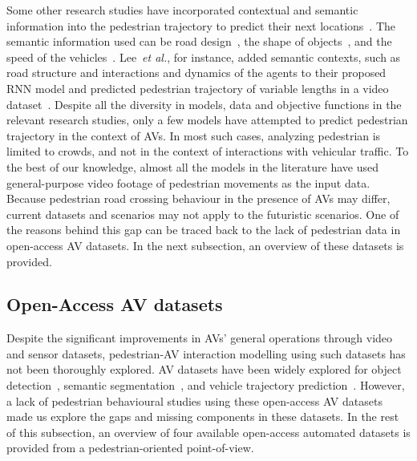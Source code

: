 Some other research studies have incorporated contextual and semantic information into the pedestrian trajectory to predict their next locations~\cite{lee2017desire,chandra2019traphic,rasouli2019pie}. The semantic information used can be road design~\cite{bi2019joint}, the shape of objects~\cite{chandra2019traphic}, and the speed of the vehicles~\cite{bhattacharyya2018long,rasouli2019pie}. Lee~\textit{et al.}, for instance, added semantic contexts, such as road structure and interactions and dynamics of the agents to their proposed RNN model and predicted pedestrian trajectory of variable lengths in a video dataset~\cite{lee2017desire}. Despite all the diversity in models, data and objective functions in the relevant research studies, only a few models have attempted to predict pedestrian trajectory in the context of AVs. In most such cases, analyzing pedestrian is limited to crowds, and not in the context of interactions with vehicular traffic. To the best of our knowledge, almost all the models in the literature have used general-purpose video footage of pedestrian movements as the input data. Because pedestrian road crossing behaviour in the presence of AVs may differ, current datasets and scenarios may not apply to the futuristic scenarios. One of the reasons behind this gap can be traced back to the lack of pedestrian data in open-access AV datasets. In the next subsection, an overview of these datasets is provided.

\subsection{Open-Access AV datasets}
Despite the significant improvements in AVs' general operations through video and sensor datasets, pedestrian-AV interaction modelling using such datasets has not been thoroughly explored. AV datasets have been widely explored for object detection~\cite{chang2019argoverse}, semantic segmentation~\cite{porzi2019seamless}, and vehicle trajectory prediction~\cite{gu2020lstm,chandra2020forecasting,lee2017desire}. However, a lack of pedestrian behavioural studies using these open-access AV datasets made us explore the gaps and missing components in these datasets. In the rest of this subsection, an overview of four available open-access automated datasets is provided from a pedestrian-oriented point-of-view. 
